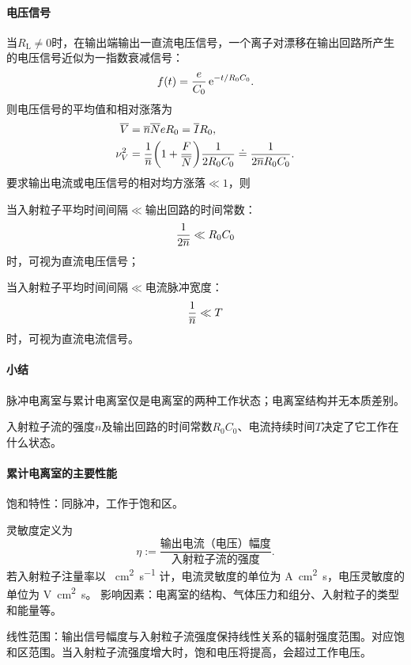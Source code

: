 \paragraph{电压信号}
当$R_{\mathrm{L}} \neq 0$时，在输出端输出一直流电压信号，一个离子对漂移在输出回路所产生的电压信号近似为一指数衰减信号：
\[
	f(t) = \frac e{C_0}\mathop{}\!\mathrm{e}^{-t/R_0C_0}.
\]
则电压信号的平均值和相对涨落为
\begin{align}
	\overline{V} &= \overline{n}\overline{N}eR_0 = \overline{I}R_0,\\
	\nu_V^2 &= \frac1{\overline{n}}\biggl(1 + \frac F{\overline{N}}\biggr)\frac1{2R_0C_0} \doteq \frac1{2\overline{n}R_0C_0}.
\end{align}
要求输出电流或电压信号的相对均方涨落$\ll 1$，则
\begin{compactenum}
	\item 
	当入射粒子平均时间间隔$\ll$输出回路的时间常数：
	\[
		\frac1{2\overline{n}} \ll R_0C_0
	\]
	时，可视为直流电压信号；
	\item 
	当入射粒子平均时间间隔$\ll$电流脉冲宽度：
	\[
		\frac1{\overline{n}} \ll T
	\]
	时，可视为直流电流信号。
\end{compactenum}
\paragraph{小结}
\begin{compactenum}
	\item 脉冲电离室与累计电离室仅是电离室的两种工作状态；电离室结构并无本质差别。
	\item 入射粒子流的强度$n$及输出回路的时间常数$R_0C_0$、电流持续时间$T$决定了它工作在什么状态。
\end{compactenum}
\paragraph{累计电离室的主要性能}
饱和特性：同脉冲，工作于饱和区。

灵敏度定义为
\begin{equation}\label{eq:nrd-current-mode-sensitivity}
	\eta := \frac{\text{输出电流（电压）幅度}}{\text{入射粒子流的强度}}.
\end{equation}
若入射粒子注量率以 \unit{\per\centi\metre\squared\per\second} 计，电流灵敏度的单位为 \unit{\ampere\centi\metre\squared\second}，电压灵敏度的单位为 \unit{\volt\centi\metre\squared\second}。
影响因素：电离室的结构、气体压力和组分、入射粒子的类型和能量等。

线性范围：输出信号幅度与入射粒子流强度保持线性关系的辐射强度范围。对应饱和区范围。当入射粒子流强度增大时，饱和电压将提高，会超过工作电压。

